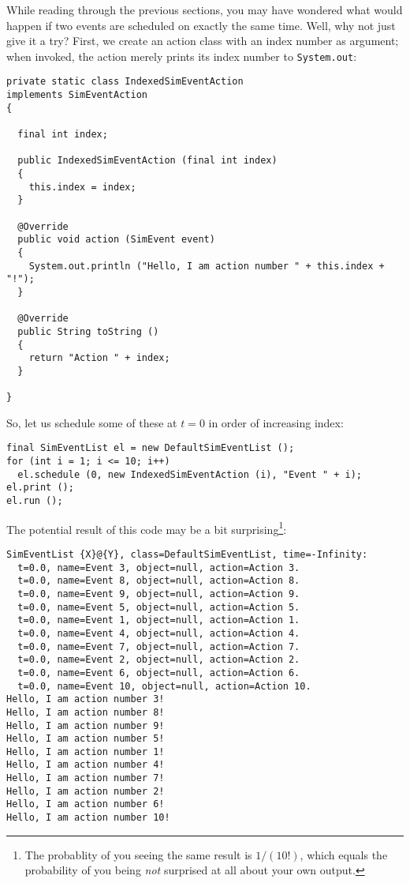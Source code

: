 \documentclass[12pt]{book}
\begin{document}
While reading through the previous sections,
  you may have wondered
  what would happen
  if two events are scheduled
  on exactly the same time.
Well, why not just give it a try?
First, we create an action class with an index number as argument;
  when invoked, the action merely prints its index number
  to \lstinline{System.out}:
\begin{lstlisting}[basicstyle=\tiny]
private static class IndexedSimEventAction
implements SimEventAction
{
  
  final int index;
  
  public IndexedSimEventAction (final int index)
  {
    this.index = index;
  }
  
  @Override
  public void action (SimEvent event)
  {
    System.out.println ("Hello, I am action number " + this.index + "!");
  }

  @Override
  public String toString ()
  {
    return "Action " + index;
  }
  
}
\end{lstlisting}
So, let us schedule some of these at $t=0$
  in order of increasing index:
\begin{lstlisting}[basicstyle=\tiny]
final SimEventList el = new DefaultSimEventList ();
for (int i = 1; i <= 10; i++)
  el.schedule (0, new IndexedSimEventAction (i), "Event " + i);
el.print ();
el.run ();
\end{lstlisting}
The potential result of this code may be a bit surprising\footnote{
The probablity of you seeing the same result is $1/(10!)$,
  which equals the probability
  of you being {\em not\/} surprised at all about your own output.}:
\begin{lstlisting}[basicstyle=\tiny]
SimEventList {X}@{Y}, class=DefaultSimEventList, time=-Infinity:
  t=0.0, name=Event 3, object=null, action=Action 3.
  t=0.0, name=Event 8, object=null, action=Action 8.
  t=0.0, name=Event 9, object=null, action=Action 9.
  t=0.0, name=Event 5, object=null, action=Action 5.
  t=0.0, name=Event 1, object=null, action=Action 1.
  t=0.0, name=Event 4, object=null, action=Action 4.
  t=0.0, name=Event 7, object=null, action=Action 7.
  t=0.0, name=Event 2, object=null, action=Action 2.
  t=0.0, name=Event 6, object=null, action=Action 6.
  t=0.0, name=Event 10, object=null, action=Action 10.
Hello, I am action number 3!
Hello, I am action number 8!
Hello, I am action number 9!
Hello, I am action number 5!
Hello, I am action number 1!
Hello, I am action number 4!
Hello, I am action number 7!
Hello, I am action number 2!
Hello, I am action number 6!
Hello, I am action number 10!
\end{lstlisting}
\end{document}

